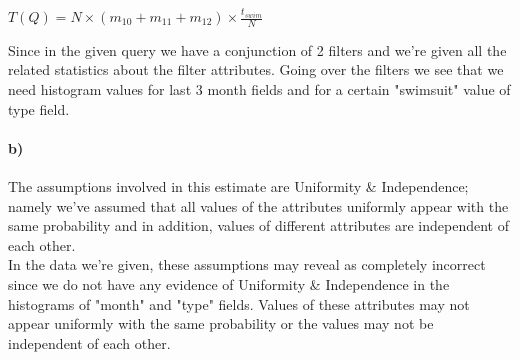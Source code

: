 \documentclass[a4paper,12pt]{article}
\begin{document}
\begin{center}
    $T(Q) = N \times (m_{10} + m_{11} + m_{12}) \times \frac{t_{swim}}{N}$
\end{center}
Since in the given query we have a conjunction of 2 filters and we're given all the related statistics about the filter attributes. Going over the filters we see that we need histogram values for last 3 month fields and for a certain "swimsuit" value of type field.

\paragraph{b)} The assumptions involved in this estimate are Uniformity \& Independence; namely we've assumed that all values of the attributes uniformly appear with the same probability and in addition, values of different attributes are independent of each other. \\

In the data we're given, these assumptions may reveal as completely incorrect since we do not have any evidence of Uniformity \& Independence in the histograms of "month" and "type" fields. Values of these attributes may not appear uniformly with the same probability or the values may not be independent of each other.
\end{document}
